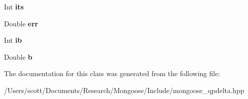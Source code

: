 \begin{DoxyCompactItemize}
\item 
Int {\bfseries its}\hypertarget{class_mongoose_1_1_q_p_delta_a16d506cec1f63ac2b6e9cc9884ffc41c}{}\label{class_mongoose_1_1_q_p_delta_a16d506cec1f63ac2b6e9cc9884ffc41c}

\item 
Double {\bfseries err}\hypertarget{class_mongoose_1_1_q_p_delta_a271b9e7d80c2475d031110a47e9e94ab}{}\label{class_mongoose_1_1_q_p_delta_a271b9e7d80c2475d031110a47e9e94ab}

\item 
Int {\bfseries ib}\hypertarget{class_mongoose_1_1_q_p_delta_a701600c7653b6ce34bf8061215273e09}{}\label{class_mongoose_1_1_q_p_delta_a701600c7653b6ce34bf8061215273e09}

\item 
Double {\bfseries b}\hypertarget{class_mongoose_1_1_q_p_delta_a1bee8231ace776a3e22c3bd00f505075}{}\label{class_mongoose_1_1_q_p_delta_a1bee8231ace776a3e22c3bd00f505075}

\end{DoxyCompactItemize}


The documentation for this class was generated from the following file\+:\begin{DoxyCompactItemize}
\item 
/\+Users/scott/\+Documents/\+Research/\+Mongoose/\+Include/mongoose\+\_\+qpdelta.\+hpp\end{DoxyCompactItemize}
